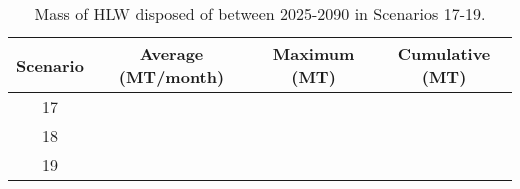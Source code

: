 \begin{table}[h!]
    \centering 
    \caption{Mass of HLW disposed of between 2025-2090 in 
    Scenarios 17-19.}
    \label{tab:hlw_17-19}
    \begin{tabular}{c c c c}
        \hline 
        Scenario & Average (MT/month) & Maximum (MT) & Cumulative (MT) \\
        \hline
        17 & & & \\
        18 & & & \\
        19 & & & \\
        \hline
    \end{tabular}
\end{table}
